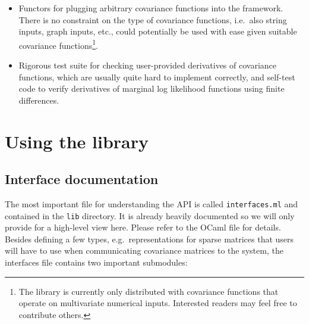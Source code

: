 \documentclass[10pt]{report}
\begin{document}
\begin{itemize}
\item Functors for plugging arbitrary covariance functions into the framework.
There is no constraint on the type of covariance functions, i.e.\ also string
inputs, graph inputs, etc., could potentially be used with ease given suitable
covariance functions\footnote{The library is currently only distributed with
covariance functions that operate on multivariate numerical inputs.  Interested
readers may feel free to contribute others.}.

\item Rigorous test suite for checking user-provided derivatives of covariance
functions, which are usually quite hard to implement correctly, and self-test
code to verify derivatives of marginal log likelihood functions using finite
differences.

\end{itemize}

\chapter{Using the library}

\section{Interface documentation}

The most important file for understanding the API is called \verb=interfaces.ml=
and contained in the \verb=lib= directory.  It is already heavily documented so
we will only provide for a high-level view here.  Please refer to the OCaml file
for details.  Besides defining a few types, e.g.\ representations for sparse
matrices that users will have to use when communicating covariance matrices to
the system, the interfaces file contains two important submodules:
\end{document}
